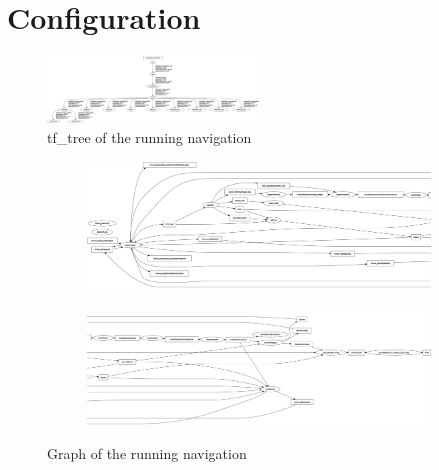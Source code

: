 \chapter{Configuration}
\label{config}

\begin{figure}[H]
	\includegraphics[angle=90, width=0.5\textwidth]{Pictures/tf tree}
	\caption{tf\_tree of the running navigation}
 	\label{tftree concept}
\end{figure}


\begin{figure}[H]
	\centering
	\begin{subfigure}{.45\textwidth}
		\includegraphics[angle=90, width=\linewidth]{Pictures/rosgraphleft}
	\end{subfigure}
	\begin{subfigure}{.45\textwidth}
		\includegraphics[angle=90, width=\linewidth]{Pictures/rosgraphright}
	\end{subfigure}
	\caption{Graph of the running navigation}
	
 	\label{graph concept}
\end{figure}